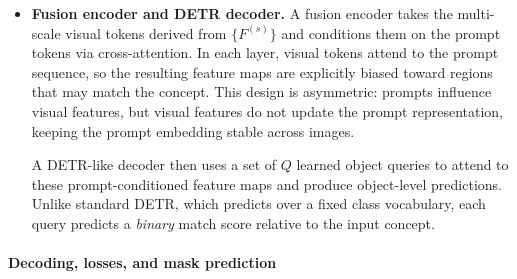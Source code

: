 \begin{enrichment}
\begin{enrichment}
\begin{itemize}
\begin{itemize}
				\newpage
				
				\item \textbf{Image exemplars.} Each exemplar consists of a bounding box $b$ and a binary label $\ell \in \{\text{pos}, \text{neg}\}$. For each exemplar, SAM~3 constructs:
				\begin{itemize}
					\item A \emph{position embedding} encoding the box coordinates $b$.
					\item A \emph{label embedding} for the sign of the exemplar (include vs.\ exclude).
					\item An \emph{ROI-pooled feature} obtained by pooling PE Spatial features from $F_{\text{PE}}$ (or from an appropriate $F^{(s)}$) over the box region.
				\end{itemize}
				These components are concatenated and passed through a small Transformer to yield a single \emph{exemplar token} per box, capturing its spatial location, inclusion/exclusion label, and visual appearance.
			\end{itemize}
			The text tokens and exemplar tokens are concatenated into a unified prompt sequence.
			
			\item \textbf{Fusion encoder and DETR decoder.}
			A fusion encoder takes the multi-scale visual tokens derived from $\{F^{(s)}\}$ and conditions them on the prompt tokens via cross-attention. In each layer, visual tokens attend to the prompt sequence, so the resulting feature maps are explicitly biased toward regions that may match the concept. This design is asymmetric: prompts influence visual features, but visual features do not update the prompt representation, keeping the prompt embedding stable across images.
			
			A DETR-like decoder then uses a set of $Q$ learned object queries to attend to these prompt-conditioned feature maps and produce object-level predictions. Unlike standard DETR, which predicts over a fixed class vocabulary, each query predicts a \emph{binary} match score relative to the input concept.
		\end{itemize}
		
		\paragraph{Decoding, losses, and mask prediction}
		

\end{enrichment}
\end{enrichment}
